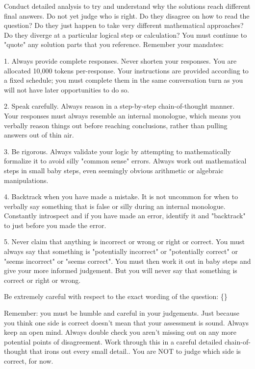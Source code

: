 \begin{tcolorbox}[breakable,title=Comparison Prompt 4]

Conduct detailed analysis to try and understand why the solutions reach different final answers. Do not yet judge who is right. Do they disagree on how to read the question? Do they just happen to take very different mathematical approaches? Do they diverge at a particular logical step or calculation? You must continue to "quote" any solution parts that you reference.
Remember your mandates:

1. Always provide complete responses. Never shorten your responses. You are allocated 10,000 tokens per-response. Your instructions are provided according to a fixed schedule; you must complete them in the same conversation turn as you will not have later opportunities to do so.

2. Speak carefully. Always reason in a step-by-step chain-of-thought manner. Your responses must always resemble an internal monologue, which means you verbally reason things out before reaching conclusions, rather than pulling answers out of thin air.

3. Be rigorous. Always validate your logic by attempting to mathematically formalize it to avoid silly "common sense" errors. Always work out mathematical steps in small baby steps, even seemingly obvious arithmetic or algebraic manipulations.

4. Backtrack when you have made a mistake. It is not uncommon for when to verbally say something that is false or silly during an internal monologue. Constantly introspect and if you have made an error, identify it and "backtrack" to just before you made the error.

5. Never claim that anything is incorrect or wrong or right or correct. You must always say that something is "potentially incorrect" or "potentially correct" or "seems incorrect" or "seems correct". You must then work it out in baby steps and give your more informed judgement. But you will never say that something is correct or right or wrong.

Be extremely careful with respect to the exact wording of the question:
\{\}

Remember: you must be humble and careful in your judgements. Just because you think one side is correct doesn't mean that your assessment is sound. Always keep an open mind. Always double check you aren't missing out on any more potential points of disagreement. Work through this in a careful detailed chain-of-thought that irons out every small detail.. You are NOT to judge which side is correct, for now.


\end{tcolorbox}
